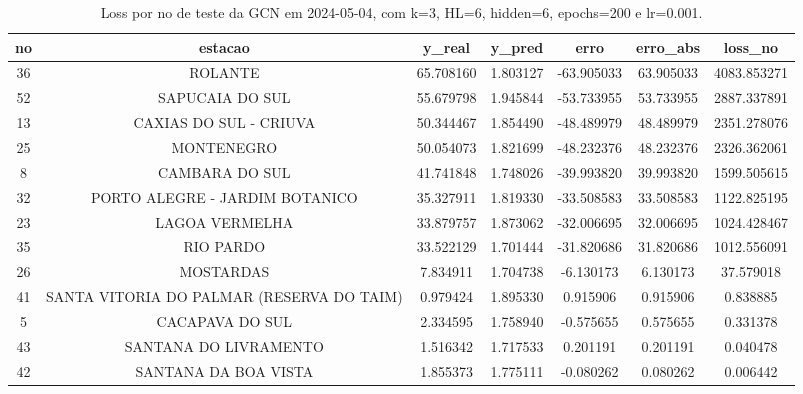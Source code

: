\begin{table}[h]
\centering
\caption{Loss por no de teste da GCN em 2024-05-04, com k=3, HL=6, hidden=6, epochs=200 e lr=0.001.}
\label{tab:gcn_loss_k3_hl6_h6_e200_d20240504}
\begin{tabular}{ccccccc}
\toprule
no & estacao & y\_real & y\_pred & erro & erro\_abs & loss\_no \\
\midrule
36 & ROLANTE & 65.708160 & 1.803127 & -63.905033 & 63.905033 & 4083.853271 \\
52 & SAPUCAIA DO SUL & 55.679798 & 1.945844 & -53.733955 & 53.733955 & 2887.337891 \\
13 & CAXIAS DO SUL - CRIUVA & 50.344467 & 1.854490 & -48.489979 & 48.489979 & 2351.278076 \\
25 & MONTENEGRO & 50.054073 & 1.821699 & -48.232376 & 48.232376 & 2326.362061 \\
8 & CAMBARA DO SUL & 41.741848 & 1.748026 & -39.993820 & 39.993820 & 1599.505615 \\
32 & PORTO ALEGRE - JARDIM BOTANICO & 35.327911 & 1.819330 & -33.508583 & 33.508583 & 1122.825195 \\
23 & LAGOA VERMELHA & 33.879757 & 1.873062 & -32.006695 & 32.006695 & 1024.428467 \\
35 & RIO PARDO & 33.522129 & 1.701444 & -31.820686 & 31.820686 & 1012.556091 \\
26 & MOSTARDAS & 7.834911 & 1.704738 & -6.130173 & 6.130173 & 37.579018 \\
41 & SANTA VITORIA DO PALMAR (RESERVA DO TAIM) & 0.979424 & 1.895330 & 0.915906 & 0.915906 & 0.838885 \\
5 & CACAPAVA DO SUL & 2.334595 & 1.758940 & -0.575655 & 0.575655 & 0.331378 \\
43 & SANTANA DO LIVRAMENTO & 1.516342 & 1.717533 & 0.201191 & 0.201191 & 0.040478 \\
42 & SANTANA DA BOA VISTA & 1.855373 & 1.775111 & -0.080262 & 0.080262 & 0.006442 \\
\bottomrule
\end{tabular}
\end{table}
